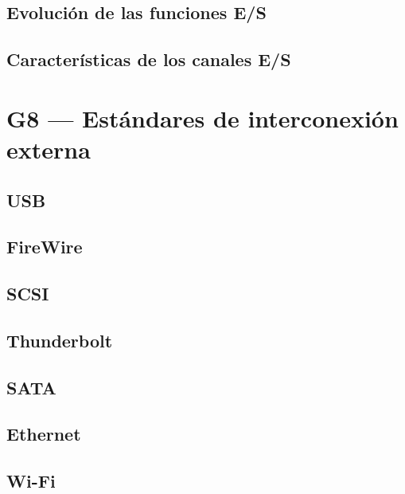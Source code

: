 \documentclass[11pt]{article}
\begin{document}
\subsection*{Evolución de las funciones E/S}
\label{sec:org96bb021}
\subsection*{Características de los canales E/S}
\label{sec:org6579748}
\section*{G8 — Estándares de interconexión externa}
\label{sec:org60ecc66}
\subsection*{USB}
\label{sec:org9f1939e}
\subsection*{FireWire}
\label{sec:org71860d2}
\subsection*{SCSI}
\label{sec:org430f017}
\subsection*{Thunderbolt}
\label{sec:org626a14a}
\subsection*{SATA}
\label{sec:org3cc51ed}
\subsection*{Ethernet}
\label{sec:org495bfb8}
\subsection*{Wi-Fi}
\label{sec:org21a49ff}

\printbibliography
\end{document}
